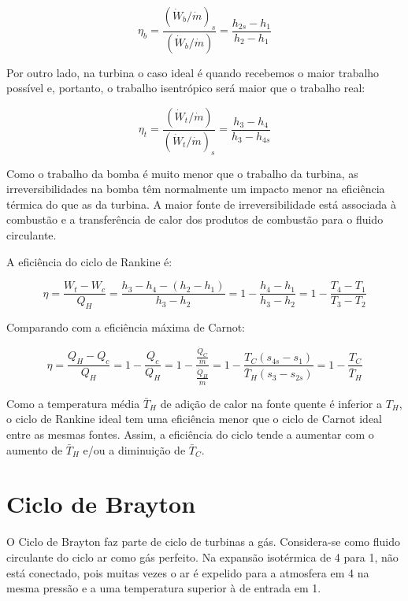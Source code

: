 \begin{equation}
    \eta_b = \frac{(\dot{W}_b/\dot{m})_s}{(\dot{W}_b/\dot{m})} = \frac{h_{2s} - h_1}{h_{2} - h_1}
\end{equation}

Por outro lado, na turbina o caso ideal é quando recebemos o maior trabalho possível e, portanto, o trabalho isentrópico será maior que o trabalho real:

\begin{equation}
    \eta_t = \frac{(\dot{W}_t/\dot{m})}{(\dot{W}_t/\dot{m})_s} = \frac{h_3 - h_4}{h_3 - h_{4s}}
\end{equation}

Como o trabalho da bomba é muito menor que o trabalho da turbina, as irreversibilidades na bomba têm normalmente um impacto menor na eficiência térmica do que as da turbina. A maior fonte de irreversibilidade está associada à combustão e a transferência de calor dos produtos de combustão para o fluido circulante.

A eficiência do ciclo de Rankine é:

\begin{equation}
    \eta = \frac{W_t - W_c}{Q_H} = \frac{h_3 - h_4 - (h_2 - h_1)}{h_3 - h_2} = 1 - \frac{h_4 - h_1}{h_3 - h_2} = 1 - \frac{T_4 - T_1}{T_3 - T_2} 
\end{equation}

Comparando com a eficiência máxima de Carnot:

\begin{equation*}
    \eta = \frac{Q_H - Q_c}{Q_H} = 1 - \frac{Q_c}{Q_H} = 1 - \frac{\frac{\dot{Q}_C}{\dot{m}}}{\frac{\dot{Q}_H}{\dot{m}}} = 1 -\frac{T_C (s_{4s} - s_1)}{\bar{T}_H (s_3 - s_{2s})} = 1 -\frac{T_C}{\bar{T}_H}
\end{equation*}

Como a temperatura média $\bar{T}_H$ de adição de calor na fonte quente é inferior a $T_H$, o ciclo de Rankine ideal tem uma eficiência menor que o ciclo de Carnot ideal entre as mesmas fontes. Assim, a eficiência do ciclo tende a aumentar com o aumento de $\bar{T}_H$ e/ou a diminuição de $\bar{T}_C$.



\section{Ciclo de Brayton}

O Ciclo de Brayton faz parte de ciclo de turbinas a gás. Considera-se como fluido circulante do ciclo ar como gás perfeito. Na expansão isotérmica de 4 para 1, não está conectado, pois muitas vezes o ar é expelido para a atmosfera em 4 na mesma pressão e a uma temperatura superior à de entrada em 1.

